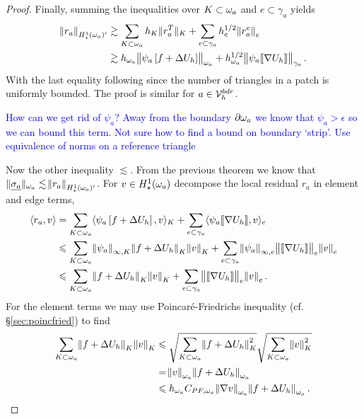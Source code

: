 \documentclass[thesis.tex]{subfiles}
\begin{document}
\begin{proof}
  Finally, summing the inequalities over $K \subset \omega_a$ and $e \subset \gamma_a$ yields
  \begin{align*}
    \norm{r_a}_{H_\star^1(\omega_a)'} &\gtrsim \sum_{K \subset \omega_a} h_K \|{r^T_a}\|_K + \sum_{e \subset \gamma_a} h_e^{1/2} \norm{r^e_a}_e\\
    &\gtrsim h_{\omega_a} \norm{\psi_a \left[ f + \Delta U_h \right]}_{\omega_a} + h_{\omega_a}^{1/2} \norm{ \psi_a \llbracket \nabla U_h \rrbracket}_{\gamma_a}.
  \end{align*}
  With the last equality following since the number of triangles in a patch is uniformly bounded. The proof is similar for $a \in \mathcal{V}_h^{bdr}$.

  \textcolor{blue}{How can we get rid of $\psi_a$? Away from the boundary $\partial \omega_a$ we know that $\psi_a > \epsilon$ so we can bound this term. Not sure how to find a bound on boundary `strip'. Use equivalence of norms on a reference triangle}


  Now the other inequality $\lesssim$. From the previous theorem we know that $\| \underline{\sigma_a} \|_{\omega_a} \lesssim \norm{r_a}_{H_\star^1(\omega_a)'}$. For $v \in H_\star^1(\omega_a)$ decompose the local residual $r_a$ in element and edge terms,
  \begin{align*}
    \langle r_a, v \rangle &= \sum_{K \subset \omega_a} \langle \psi_a\left[f + \Delta U_h\right], v \rangle_{K} + \sum_{e \subset \gamma_a} \langle \psi_a \llbracket \nabla U_h \rrbracket, v \rangle_e\\
    &\leqslant \sum_{K \subset \omega_a} \norm{\psi_a}_{\infty,K} \norm{f + \Delta U_h}_{K}\norm{v}_{K} + \sum_{e \subset \gamma_a} \norm{\psi_a}_{\infty, e} \norm{ \llbracket \nabla U_h \rrbracket}_e \norm{v}_e\\
    &\leqslant \sum_{K \subset \omega_a} \norm{f + \Delta U_h}_{K}\norm{v}_{K} + \sum_{e \subset \gamma_a} \norm{ \llbracket \nabla U_h \rrbracket}_e \norm{v}_e.
  \end{align*}
  For the element terms we may use Poincar\'e-Friedrichs inequality (cf. \S\ref{sec:poincfried}) to find
  \begin{align*}
    \sum_{K \subset \omega_a} \norm{f + \Delta U_h}_{K} \norm{v}_K &\leqslant \sqrt{\sum_{K \subset \omega_a} \norm{f + \Delta U_h}^2_K}\sqrt{\sum_{K \subset \omega_a} \norm{v}^2_K} \\
    &= \norm{v}_{\omega_a} \norm{f + \Delta U_h}_{\omega_a} \\
    &\leqslant h_{\omega_a} C_{PF,\omega_a} \norm{\nabla v}_{\omega_a} \norm{f + \Delta U_h}_{\omega_a}.
  \end{align*}


\end{proof}
\end{document}
